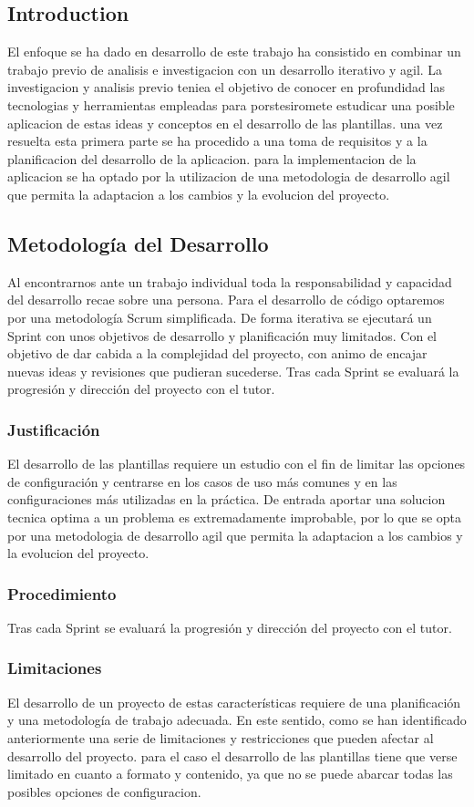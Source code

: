 \documentclass[12pt, a4paper, twoside]{article}
\begin{document}
\subsection{Introduction}
El enfoque se ha dado en desarrollo de este trabajo ha consistido en combinar un trabajo previo de analisis e investigacion con un desarrollo iterativo y agil.
La investigacion y analisis previo teniea el objetivo de conocer en profundidad las tecnologias y herramientas empleadas
para porstesiromete estudicar una posible aplicacion de estas ideas y conceptos en el desarrollo de las plantillas.
una vez resuelta esta primera parte se ha procedido a una toma de requisitos y a la planificacion del desarrollo de la aplicacion.
para la implementacion de la aplicacion se ha optado por la utilizacion de una metodologia de desarrollo agil que permita la adaptacion a los cambios y la evolucion del proyecto.
\subsection{Metodología del Desarrollo}
Al encontrarnos ante un trabajo individual toda la responsabilidad y capacidad del desarrollo recae sobre una persona. 
Para el desarrollo de código optaremos por una metodología Scrum simplificada. De forma iterativa se ejecutará un Sprint con 
unos objetivos de desarrollo y planificación muy limitados. Con el objetivo de dar cabida a la complejidad del proyecto, 
con animo de encajar nuevas ideas y revisiones que pudieran sucederse.
Tras cada Sprint se evaluará la progresión y dirección del proyecto con el tutor. 
\subsubsection{Justificación}

El desarrollo de las plantillas requiere un estudio con el fin de limitar las opciones de configuración y centrarse en los casos de uso más comunes y en las configuraciones más utilizadas en la práctica.
De entrada aportar una solucion tecnica optima a un problema es extremadamente improbable, por lo que se opta por una metodologia de desarrollo agil que permita la adaptacion a los cambios y la evolucion del proyecto.
\subsubsection{Procedimiento}
Tras cada Sprint se evaluará la progresión y dirección del proyecto con el tutor. 
\subsubsection{Limitaciones}
El desarrollo de un proyecto de estas características requiere de una planificación y una metodología de trabajo adecuada.
En este sentido, como se han identificado anteriormente una serie de limitaciones y restricciones que pueden afectar al desarrollo del proyecto.
para el caso el desarrollo de las plantillas tiene que verse limitado en cuanto a formato y contenido, ya que no se puede abarcar todas las posibles opciones de configuracion.
\end{document}
